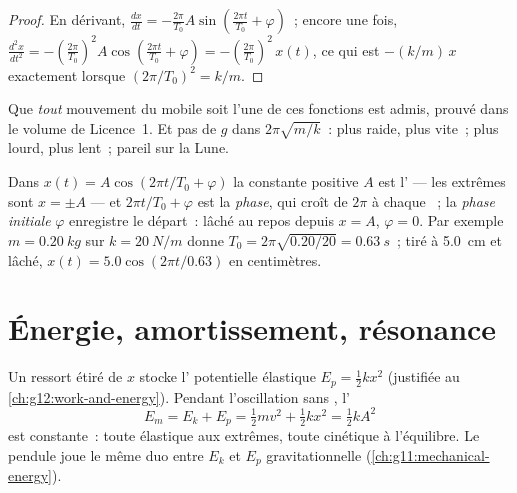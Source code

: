 \begin{proof}
En dérivant, $\frac{dx}{dt} = -\frac{2\pi}{T_0}A \sin(\frac{2\pi
t}{T_0} + \varphi)$~; encore une fois, $\frac{d^2x}{dt^2} =
-(\frac{2\pi}{T_0})^2 A\cos(\frac{2\pi t}{T_0} + \varphi) =
-(\frac{2\pi}{T_0})^2\,x(t)$, ce qui est $-(k/m)\,x$ exactement
lorsque $(2\pi/T_0)^2 = k/m$.
\end{proof}

\begin{remark}\label{rem:g12:oscillators-and-time:uniqueness}
Que \emph{tout} mouvement du mobile soit l'une de ces fonctions est
admis, prouvé dans le volume de Licence~1. Et pas de $g$ dans
$2\pi\sqrt{m/k}$~: plus raide, plus vite~; plus lourd, plus lent~;
pareil sur la Lune.
\end{remark}

\begin{definition}\label{def:g12:oscillators-and-time:phase}
Dans $x(t) = A\cos(2\pi t/T_0 + \varphi)$ la constante positive $A$
est l' --- les extrêmes sont $x = \pm A$ --- et
$2\pi t/T_0 + \varphi$ est la \emph{phase}, qui croît de
$2\pi$ à chaque ~; la \emph{phase initiale}%
 $\varphi$ enregistre le départ~: lâché au
repos depuis $x = A$, $\varphi = 0$. Par exemple $m = \qty{0.20}{kg}$
sur $k = \qty{20}{N/m}$ donne $T_0 = 2\pi\sqrt{0.20/20} =
\qty{0.63}{s}$~; tiré à \qty{5.0}{cm} et lâché, $x(t) =
5.0\cos(2\pi t/0.63)$ en centimètres.
\end{definition}

\section{Énergie, amortissement, résonance}

\begin{proposition}\label{prop:g12:oscillators-and-time:energy}
Un ressort étiré de $x$ stocke l' potentielle élastique
$E_p = \tfrac12 kx^2$ (justifiée au \cref{ch:g12:work-and-energy}).
Pendant l'oscillation sans , l'
\[
E_m = E_k + E_p = \tfrac12 m v^2 + \tfrac12 k x^2 = \tfrac12 k A^2
\]
est constante~: toute élastique aux extrêmes, toute cinétique à
l'équilibre. Le pendule joue le même duo entre $E_k$ et $E_p$
gravitationnelle (\cref{ch:g11:mechanical-energy}).
\end{proposition}

